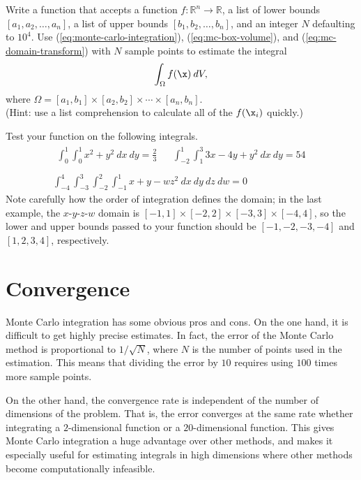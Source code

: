 \begin{problem}
Write a function that accepts a function $f:\mathbb{R}^n\rightarrow\mathbb{R}$, a list of lower bounds $[a_1, a_2, \ldots, a_n]$, a list of upper bounds $[b_1, b_2, \ldots, b_n]$, and an integer $N$ defaulting to $10^4$.
Use (\ref{eq:monte-carlo-integration}), (\ref{eq:mc-box-volume}), and (\ref{eq:mc-domain-transform}) with $N$ sample points to estimate the integral
\[
\int_\Omega f(\x)\:dV,
\]
where $\Omega = [a_1,b_1]\times[a_2,b_2]\times\cdots\times[a_n,b_n]$.
\\(Hint: use a list comprehension to calculate all of the $f(\x_i)$ quickly.)

Test your function on the following integrals.
\[
\begin{array}{c}
    \begin{array}{ccc}
    \displaystyle\int_0^1\int_0^1 x^2 + y^2\:dx\:dy = \frac{2}{3}
    & &
    \displaystyle\int_{-2}^1\int_1^3 3x - 4y + y^2\:dx\:dy = 54
    \end{array}
\\ \\
\displaystyle\int_{-4}^4\int_{-3}^3\int_{-2}^2\int_{-1}^1 x + y - w z^2\:dx\:dy\:dz\:dw = 0
\end{array}
\]
Note carefully how the order of integration defines the domain; in the last example, the $x$-$y$-$z$-$w$ domain is $[-1,1]\times[-2,2]\times[-3,3]\times[-4,4]$, so the lower and upper bounds passed to your function should be $[-1, -2, -3, -4]$ and $[1, 2, 3, 4]$, respectively.
\label{prob:montecarlo-integration-nd}
\end{problem}

\section*{Convergence} %

Monte Carlo integration has some obvious pros and cons.
On the one hand, it is difficult to get highly precise estimates.
In fact, the error of the Monte Carlo method is proportional to $1/\sqrt{N}$, where $N$ is the number of points used in the estimation.
This means that dividing the error by $10$ requires using $100$ times more sample points.

On the other hand, the convergence rate is independent of the number of dimensions of the problem.
That is, the error converges at the same rate whether integrating a $2$-dimensional function or a $20$-dimensional function.
This gives Monte Carlo integration a huge advantage over other methods, and makes it especially useful for estimating integrals in high dimensions where other methods become computationally infeasible.

